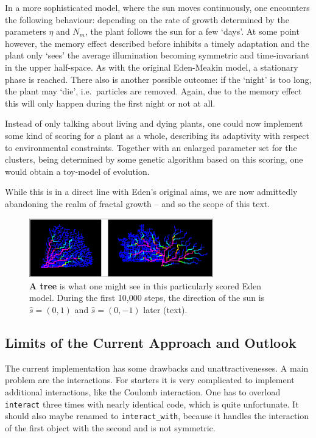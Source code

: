 \documentclass[twocolumn, 10pt]{scrartcl}
\begin{document}
                In a more sophisticated model, where the sun moves continuously, one encounters the following
                behaviour: depending on the rate of growth determined by the parameters $\eta$ and $N_m$, the
                plant follows the sun for a few `days'. At some point however, the memory effect described before
                inhibits a timely adaptation and the plant only `sees' the average illumination becoming
                symmetric and time-invariant in the upper half-space. As with the original Eden-Meakin model, a
                stationary phase is reached. There also is another possible outcome: if the `night' is too long,
                the plant may `die', i.e.\ particles are removed. Again, due to the memory effect this will
                only happen during the first night or not at all.

                Instead of only talking about living and dying plants, one could now implement some kind of
                scoring for a plant as a whole, describing its adaptivity with respect to environmental constraints.
                Together with an enlarged parameter set for the clusters, being determined by some genetic
                algorithm based on this scoring, one would obtain a toy-model of evolution.

                While this is in a direct line with Eden's original aims, we are now admittedly abandoning
                the realm of fractal growth -- and so the scope of this text.

        \begin{figure}
            \center
            \includegraphics[width=8cm]{img/edentree.png}
            \caption[A tree]
                {\small\textbf{A tree} is what one might see in this particularly scored Eden model. During
                the first 10,000 steps, the direction of the sun is $\hat s=(0,1)$ and $\hat s=(0,-1)$ later
                (text).}
            \label{fig-edentree}
        \end{figure}

        \subsection{Limits of the Current Approach and Outlook}
            \label{sec-limits}
            The current implementation has some drawbacks and unattractivenesses. A main problem are the
            interactions. For starters it is very complicated to implement additional interactions, like the Coulomb
            interaction. One has to overload \lstinline'interact' three times with nearly identical code, which is
            quite unfortunate. It should also maybe renamed to \lstinline'interact_with', because it handles the
            interaction of the first object with the second and is not symmetric.
\end{document}
